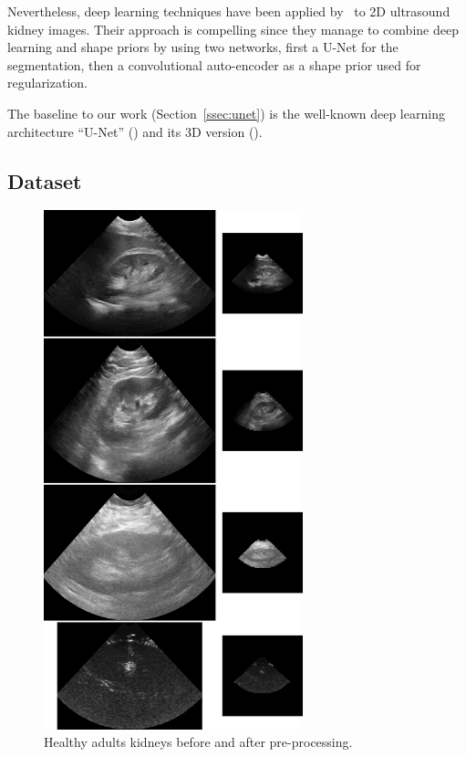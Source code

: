 Nevertheless, deep learning techniques have been applied by~\textcite{ravishankar2017MICCAI} to 2D ultrasound kidney images. Their approach is compelling since they manage to combine deep learning and shape priors by using two networks, first a U-Net for the segmentation, then a convolutional auto-encoder as a shape prior used for regularization.

The baseline to our work (Section~\ref{ssec:unet}) is the well-known deep learning architecture ``U-Net'' (\textcite{ronneberger2015MICCAI}) and its 3D version (\textcite{cicek2016MICCAI}). 


\subsection{Dataset}
\label{ssec:data}

\begin{figure}[htbp]
    \centering
	\includegraphics[width=0.67\textwidth]{img_transfer/adults_prep}
    \caption{Healthy adults kidneys before and after pre-processing.}
    \label{fig:adults_prep}
\end{figure}

